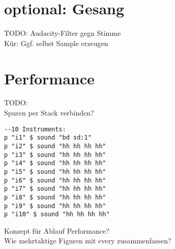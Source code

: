 \documentclass[
10pt, %
a4paper, %
oneside, %
headinclude,footinclude, %
BCOR5mm, %
]{scrartcl}
\begin{document}
\section{optional: Gesang}
TODO: Audacity-Filter gegn Stimme\\
Kür: Ggf. selbst Sample erzeugen


\section{Performance}
TODO:\\
Spuren per Stack verbinden?\\

\begin{lstlisting}
--10 Instruments:
p "i1" $ sound "bd sd:1"
p "i2" $ sound "hh hh hh hh"
p "i3" $ sound "hh hh hh hh"
p "i4" $ sound "hh hh hh hh"
p "i5" $ sound "hh hh hh hh"
p "i6" $ sound "hh hh hh hh"
p "i7" $ sound "hh hh hh hh"
p "i8" $ sound "hh hh hh hh"
p "i9" $ sound "hh hh hh hh"
p "i10" $ sound "hh hh hh hh"
\end{lstlisting}
Konzept für Ablauf Performance?\\
Wie mehrtaktige Figuren mit every zusammenfassen?


\pagebreak


\renewcommand{\refname}{\spacedlowsmallcaps{Literatur/Quellen}} %




\end{document}
